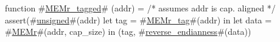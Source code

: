 function #\hyperref[zMEMrzytagged]{MEMr\_tagged}# (addr) =
{
  /* assumes addr is cap. aligned */
  assert(#\hyperref[zunsigned]{unsigned}#(addr) %
  let tag  = #\hyperref[zMEMrzytag]{MEMr\_tag}#(addr) in
  let data = #\hyperref[zMEMr]{MEMr}#(addr, cap_size) in
  (tag, #\hyperref[zreversezyendianness]{reverse\_endianness}#(data))
}
